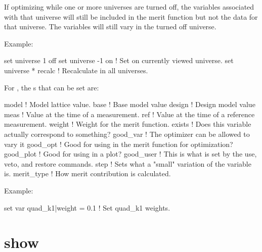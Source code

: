 {{\begin{description}
If optimizing while one or more universes are turned off, the
variables associated with that universe will still be included in the
merit function but not the data for that universe. The variables will
still vary in the turned off universe.

Example:
\begin{example}
  set universe 1 off
  set universe -1 on    ! Set on currently viewed universe.
  set universe * recalc ! Recalculate in all universes.
\end{example}


\item[set var <var\_name>|<component> = <value>] \Newline

For , the s that can be set are:
\begin{example}
  model       ! Model lattice value.
  base        ! Base model value
  design      ! Design model value
  meas        ! Value at the time of a measurement.
  ref         ! Value at the time of a reference measurement.
  weight      ! Weight for the merit function.
  exists      ! Does this variable actually correspond to something?
  good_var    ! The optimizer can be allowed to vary it
  good_opt    ! Good for using in the merit function for optimization?
  good_plot   ! Good for using in a plot?
  good_user   ! This is what is set by the use, veto, and restore commands.
  step        ! Sets what a "small" variation of the variable is.
  merit_type  ! How merit contribution is calculated.
\end{example}

Example:
\begin{example}
  set var quad\_k1|weight = 0.1         ! Set quad\_k1 weights. 
\end{example}

\end{description}

\section{show}
\label{s:show}

}}

